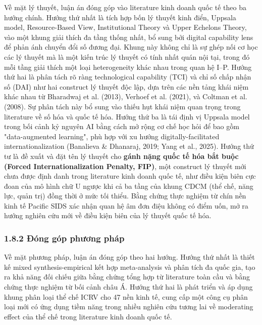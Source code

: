 \documentclass[12pt,a4paper]{article}
\begin{document}
Về mặt lý thuyết, luận án đóng góp vào literature kinh doanh quốc tế
theo ba hướng chính. Hướng thứ nhất là tích hợp bốn lý thuyết kinh điển,
Uppsala model, Resource-Based View, Institutional Theory và Upper
Echelons Theory, vào một khung giải thích đa tầng thống nhất, bổ sung
bởi digital capability lens để phản ánh chuyển đổi số đương đại. Khung
này không chỉ là sự ghép nối cơ học các lý thuyết mà là một kiến trúc lý
thuyết có tính nhất quán nội tại, trong đó mỗi tầng giải thích một loại
heterogeneity khác nhau trong quan hệ I--P. Hướng thứ hai là phân tách
rõ ràng technological capability (TCI) và chỉ số chấp nhận số (DAI) như
hai construct lý thuyết độc lập, dựa trên các nền tảng khái niệm khác
nhau từ Bharadwaj et al. (2013), Verhoef et al. (2021), và Coltman et
al. (2008). Sự phân tách này bổ sung vào thiếu hụt khái niệm quan trọng
trong literature về số hóa và quốc tế hóa. Hướng thứ ba là tái định vị
Uppsala model trong bối cảnh kỷ nguyên AI bằng cách mở rộng cơ chế học
hỏi để bao gồm "data-augmented learning", phù hợp với xu hướng
digitally-facilitated internationalization (Banalieva \& Dhanaraj, 2019;
Yang et al., 2025). Hướng thứ tư là đề xuất và đặt tên lý thuyết cho
\textbf{gánh nặng quốc tế hóa bắt buộc (Forced Internationalization
Penalty, FIP)}, một construct lý thuyết mới chưa được định danh trong
literature kinh doanh quốc tế, như điều kiện biên cực đoan của mô hình
chữ U ngược khi cả ba tầng của khung CDCM (thể chế, năng lực, quản trị)
đồng thời ở mức tối thiểu. Bằng chứng thực nghiệm từ chín nền kinh tế
Pacific SIDS xác nhận quan hệ âm đơn điệu không có điểm uốn, mở ra hướng
nghiên cứu mới về điều kiện biên của lý thuyết quốc tế hóa.

\hypertarget{182-ux111uxf3ng-guxf3p-phux1b0ux1a1ng-phuxe1p}{%
\subsubsection{1.8.2 Đóng góp phương
pháp}\label{182-ux111uxf3ng-guxf3p-phux1b0ux1a1ng-phuxe1p}}

Về mặt phương pháp, luận án đóng góp theo hai hướng. Hướng thứ nhất là
thiết kế mixed synthesis-empirical kết hợp meta-analysis và phân tích đa
quốc gia, tạo ra khả năng đối chiếu giữa bằng chứng tổng hợp từ
literature toàn cầu và bằng chứng thực nghiệm từ bối cảnh châu Á. Hướng
thứ hai là phát triển và áp dụng khung phân loại thể chế ICRV cho 47 nền
kinh tế, cung cấp một công cụ phân loại mới có ứng dụng tiềm năng trong
nhiều nghiên cứu tương lai về moderating effect của thể chế trong
literature kinh doanh quốc tế.
\end{document}
